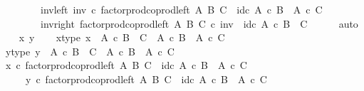 \begin{isabellebody}
\ \ \ \ \ \ \ \ inv{\isacharunderscore}{\kern0pt}left{\isacharcolon}{\kern0pt}\ {\isachardoublequoteopen}inv\ {\isasymcirc}\isactrlsub c\ factor{\isacharunderscore}{\kern0pt}prod{\isacharunderscore}{\kern0pt}coprod{\isacharunderscore}{\kern0pt}left\ A\ B\ C\ {\isacharequal}{\kern0pt}\ id\isactrlsub c\ {\isacharparenleft}{\kern0pt}{\isacharparenleft}{\kern0pt}A\ {\isasymtimes}\isactrlsub c\ B{\isacharparenright}{\kern0pt}\ {\isasymCoprod}\ A\ {\isasymtimes}\isactrlsub c\ C{\isacharparenright}{\kern0pt}{\isachardoublequoteclose}\ \isanewline
\ \ \ \ \ \ \ \ inv{\isacharunderscore}{\kern0pt}right{\isacharcolon}{\kern0pt}\ {\isachardoublequoteopen}factor{\isacharunderscore}{\kern0pt}prod{\isacharunderscore}{\kern0pt}coprod{\isacharunderscore}{\kern0pt}left\ A\ B\ C\ {\isasymcirc}\isactrlsub c\ inv\ {\isacharequal}{\kern0pt}\ id\isactrlsub c\ {\isacharparenleft}{\kern0pt}A\ {\isasymtimes}\isactrlsub c\ B\ {\isasymCoprod}\ C{\isacharparenright}{\kern0pt}{\isachardoublequoteclose}\isanewline
\ \ \ \ \isamarkupfalse%
\ auto\isanewline
\isanewline
\ \ \isamarkupfalse%
\ x\ y\isanewline
\ \ \isamarkupfalse%
\ x{\isacharunderscore}{\kern0pt}type{\isacharcolon}{\kern0pt}\ {\isachardoublequoteopen}x\ {\isacharcolon}{\kern0pt}\ A\ {\isasymtimes}\isactrlsub c\ B\ {\isasymCoprod}\ C\ {\isasymrightarrow}\ {\isacharparenleft}{\kern0pt}A\ {\isasymtimes}\isactrlsub c\ B{\isacharparenright}{\kern0pt}\ {\isasymCoprod}\ A\ {\isasymtimes}\isactrlsub c\ C{\isachardoublequoteclose}\isanewline
\ \ \isamarkupfalse%
\ y{\isacharunderscore}{\kern0pt}type{\isacharcolon}{\kern0pt}\ {\isachardoublequoteopen}y\ {\isacharcolon}{\kern0pt}\ A\ {\isasymtimes}\isactrlsub c\ B\ {\isasymCoprod}\ C\ {\isasymrightarrow}\ {\isacharparenleft}{\kern0pt}A\ {\isasymtimes}\isactrlsub c\ B{\isacharparenright}{\kern0pt}\ {\isasymCoprod}\ A\ {\isasymtimes}\isactrlsub c\ C{\isachardoublequoteclose}\isanewline
\isanewline
\ \ \isamarkupfalse%
\ {\isachardoublequoteopen}x\ {\isasymcirc}\isactrlsub c\ factor{\isacharunderscore}{\kern0pt}prod{\isacharunderscore}{\kern0pt}coprod{\isacharunderscore}{\kern0pt}left\ A\ B\ C\ {\isacharequal}{\kern0pt}\ id\isactrlsub c\ {\isacharparenleft}{\kern0pt}{\isacharparenleft}{\kern0pt}A\ {\isasymtimes}\isactrlsub c\ B{\isacharparenright}{\kern0pt}\ {\isasymCoprod}\ A\ {\isasymtimes}\isactrlsub c\ C{\isacharparenright}{\kern0pt}{\isachardoublequoteclose}\isanewline
\ \ \ \ \ {\isachardoublequoteopen}y\ {\isasymcirc}\isactrlsub c\ factor{\isacharunderscore}{\kern0pt}prod{\isacharunderscore}{\kern0pt}coprod{\isacharunderscore}{\kern0pt}left\ A\ B\ C\ {\isacharequal}{\kern0pt}\ id\isactrlsub c\ {\isacharparenleft}{\kern0pt}{\isacharparenleft}{\kern0pt}A\ {\isasymtimes}\isactrlsub c\ B{\isacharparenright}{\kern0pt}\ {\isasymCoprod}\ A\ {\isasymtimes}\isactrlsub c\ C{\isacharparenright}{\kern0pt}{\isachardoublequoteclose}\isanewline

\end{isabellebody}
